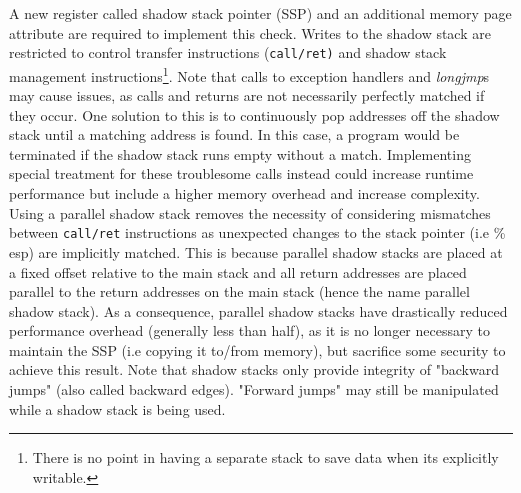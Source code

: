 \documentclass[10pt,twocolumn,a4paper]{article}
\begin{document}
A new register called shadow stack pointer (SSP) and an additional memory page attribute are required to implement this check.
Writes to the shadow stack are restricted to control transfer instructions (\texttt{call/ret)} and shadow stack management instructions\footnote{There is no point in having a separate stack to save data when its explicitly writable.}\cite{CFE}.
Note that calls to exception handlers and \emph{longjmp}s may cause issues, as calls and returns are not necessarily perfectly matched if they occur\cite{light}.
One solution to this is to continuously pop addresses off the shadow stack until a matching address is found. In this case, a program would be terminated if the shadow stack runs empty without a match\cite{performance}.
Implementing special treatment for these troublesome calls instead could increase runtime performance but include a higher memory overhead and increase complexity.
Using a parallel shadow stack removes the necessity of considering mismatches between \texttt{call/ret} instructions as unexpected changes to the stack pointer (i.e \% esp) are implicitly matched\cite{performance}.
This is because parallel shadow stacks are placed at a fixed offset relative to the main stack and all return addresses are placed parallel to the return addresses on the main stack (hence the name parallel shadow stack). 
As a consequence, parallel shadow stacks have drastically reduced performance overhead (generally less than half), as it is no longer necessary to maintain the SSP (i.e copying it to/from memory), but sacrifice some security to achieve this result\cite{performance}.
Note that shadow stacks only provide integrity of "backward jumps" (also called backward edges). "Forward jumps" may still be manipulated while a shadow stack is being used.
\end{document}
